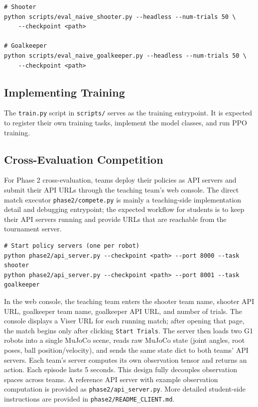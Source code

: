 \documentclass{article}
\begin{document}
\begin{verbatim}
# Shooter
python scripts/eval_naive_shooter.py --headless --num-trials 50 \
    --checkpoint <path>

# Goalkeeper
python scripts/eval_naive_goalkeeper.py --headless --num-trials 50 \
    --checkpoint <path>
\end{verbatim}

\subsection{Implementing Training}

The \texttt{train.py} script in \texttt{scripts/} serves as the training entrypoint. It is expected to register their own training tasks, implement the model classes, and run PPO training.

\subsection{Cross-Evaluation Competition}

For Phase 2 cross-evaluation, teams deploy their policies as API servers and submit their API URLs through the teaching team's web console. The direct match executor \texttt{phase2/compete.py} is mainly a teaching-side implementation detail and debugging entrypoint; the expected workflow for students is to keep their API servers running and provide URLs that are reachable from the tournament server.

\begin{verbatim}
# Start policy servers (one per robot)
python phase2/api_server.py --checkpoint <path> --port 8000 --task shooter
python phase2/api_server.py --checkpoint <path> --port 8001 --task goalkeeper
\end{verbatim}

In the web console, the teaching team enters the shooter team name, shooter API URL, goalkeeper team name, goalkeeper API URL, and number of trials. The console displays a Viser URL for each running match; after opening that page, the match begins only after clicking \texttt{Start Trials}. The server then loads two G1 robots into a single MuJoCo scene, reads raw MuJoCo state (joint angles, root poses, ball position/velocity), and sends the same state dict to both teams' API servers. Each team's server computes its own observation tensor and returns an action. Each episode lasts 5 seconds. This design fully decouples observation spaces across teams. A reference API server with example observation computation is provided as \texttt{phase2/api\_server.py}. More detailed student-side instructions are provided in \texttt{phase2/README\_CLIENT.md}.
\end{document}
